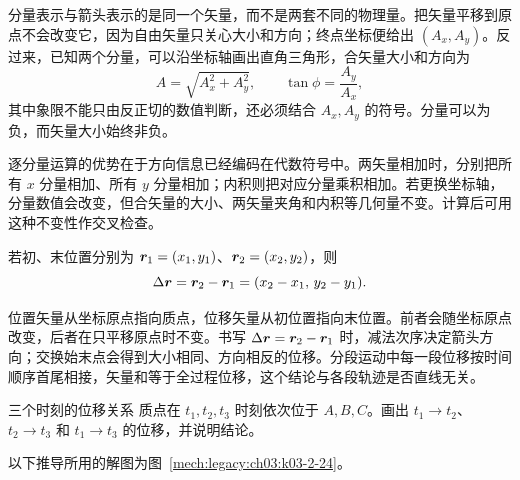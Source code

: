 {\VectorComponentsDiagram

分量表示与箭头表示的是同一个矢量，而不是两套不同的物理量。把矢量平移到原点不会改变它，因为自由矢量只关心大小和方向；终点坐标便给出 $(A_x,A_y)$。反过来，已知两个分量，可以沿坐标轴画出直角三角形，合矢量大小和方向为
\begin{equation}
 A=\sqrt{A_x^2+A_y^2},\qquad
 \tan\phi=\frac{A_y}{A_x},
\end{equation}
其中象限不能只由反正切的数值判断，还必须结合 $A_x,A_y$ 的符号。分量可以为负，而矢量大小始终非负。

逐分量运算的优势在于方向信息已经编码在代数符号中。两矢量相加时，分别把所有 $x$ 分量相加、所有 $y$ 分量相加；内积则把对应分量乘积相加。若更换坐标轴，分量数值会改变，但合矢量的大小、两矢量夹角和内积等几何量不变。计算后可用这种不变性作交叉检查。

若初、末位置分别为 $\bm{r}_1=(x_1,y_1)$、$\bm{r}_2=(x_2,y_2)$，则
\begin{equation}
\Delta\bm{r}=\bm{r}_2-\bm{r}_1=(x_2-x_1,\,y_2-y_1).
\end{equation}

位置矢量从坐标原点指向质点，位移矢量从初位置指向末位置。前者会随坐标原点改变，后者在只平移原点时不变。书写 $\Delta\bm{r}=\bm{r}_2-\bm{r}_1$ 时，减法次序决定箭头方向；交换始末点会得到大小相同、方向相反的位移。分段运动中每一段位移按时间顺序首尾相接，矢量和等于全过程位移，这个结论与各段轨迹是否直线无关。

\begin{origexamplebox}{三个时刻的位移关系}\label{ch03:ex:k03-2-24}
质点在 $t_1,t_2,t_3$ 时刻依次位于 $A,B,C$。画出 $t_1\to t_2$、$t_2\to t_3$ 和 $t_1\to t_3$ 的位移，并说明结论。

\begin{qualityfigure}
\label{mech:03:24:q}
\end{qualityfigure}
\end{origexamplebox}
\begin{xesolution}
以下推导所用的解图为图~\ref{mech:legacy:ch03:k03-2-24}。


\end{xesolution}}
